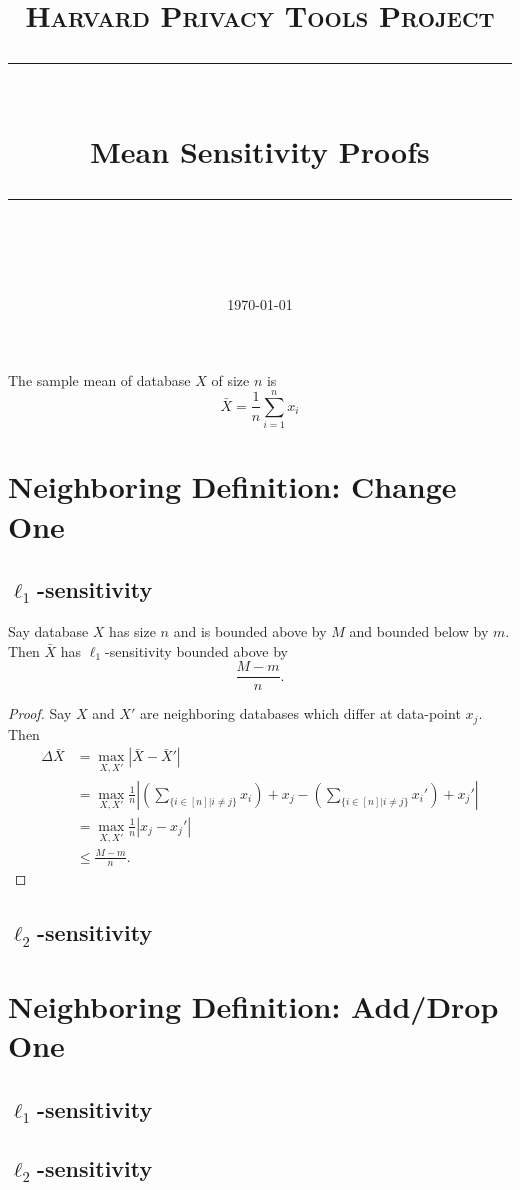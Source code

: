 \documentclass[11pt]{scrartcl} %
\title{
	\normalfont\normalsize
	\textsc{Harvard Privacy Tools Project}\\ %
	\vspace{25pt} %
	\rule{\linewidth}{0.5pt}\\ %
	\vspace{20pt} %
	{\huge Mean Sensitivity Proofs}\\ %
	\vspace{12pt} %
	\rule{\linewidth}{2pt}\\ %
	\vspace{12pt} %
}
\date{\normalsize\today} %
\begin{document}
\maketitle 

\begin{definition}
The sample mean of database $X$ of size $n$ is 
$$\bar{X} = \frac{1}{n} \sum_{i=1}^n x_i $$
\end{definition}

\section{Neighboring Definition: Change One}
\subsection{$\ell_1$-sensitivity}
\begin{theorem}
Say database $X$ has size $n$ and is bounded above by $M$ and bounded below by $m$. Then $\bar{X}$ has $\ell_1$-sensitivity bounded above by 
$$ \frac{M-m}{n}.$$
\end{theorem}

\begin{proof}
Say $X$ and $X'$ are neighboring databases which differ at data-point $x_j$. Then
\begin{align*}
\Delta{\bar{X}} &= \max_{X,X'} \left\vert \bar{X} - \bar{X}' \right\vert \\
	&=  \max_{X,X'} \frac{1}{n} \left\vert \left(\sum_{\{ i \in [n] \vert i \ne j\}} x_i\right) + x_j  - \left(\sum_{\{ i \in [n] \vert i \ne j\}} x_i'\right) + x_j'  \right\vert \\
	&= \max_{X,X'} \frac{1}{n} \left\vert x_j - x_j' \right\vert \\
	&\le \frac{M-m}{n}.
\end{align*}
\end{proof}
\subsection{$\ell_2$-sensitivity}

\section{Neighboring Definition: Add/Drop One}
\subsection{$\ell_1$-sensitivity}

\subsection{$\ell_2$-sensitivity}



\end{document}
